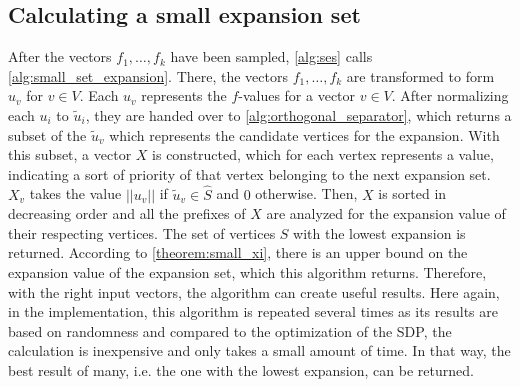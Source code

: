 \subsection{Calculating a small expansion set}

After the vectors $f_1, \ldots, f_k$ have been sampled, \cref{alg:ses} calls \cref{alg:small_set_expansion}. There, the vectors $f_1 , \ldots , f_k$ are transformed to form $u_v$ for $v\in V$. Each $u_v$ represents the $f$-values for a vector $v\in V$.
After normalizing each $u_i$ to $\tilde{u}_i $, they are handed over to \cref{alg:orthogonal_separator}, which returns a subset of the $\tilde{u}_v$ which represents the candidate vertices for the expansion. With this subset, a vector $X$ is constructed, which for each vertex represents a value, indicating a sort of priority of that vertex belonging to the next expansion set. $X_v$ takes the value $||u_v||$ if $\tilde{u}_v \in \hat{S} $ and $0$ otherwise. Then, $X$ is sorted in decreasing order and all the prefixes of $X$ are analyzed for the expansion value of their respecting vertices. The set of vertices $S$ with the lowest expansion is returned. According to \cref{theorem:small_xi}, there is an upper bound on the expansion value of the expansion set, which this algorithm returns. Therefore, with the right input vectors, the algorithm can create useful results.
Here again, in the implementation, this algorithm is repeated several times as its results are based on randomness and compared to the optimization of the SDP, the calculation is inexpensive and only takes a small amount of time. In that way, the best result of many, i.e. the one with the lowest expansion, can be returned.
